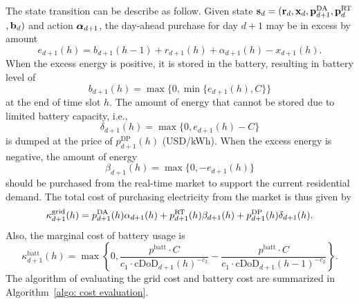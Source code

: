 The state transition can be describe as follow. Given state ${\mathbf s}_d = ({\mathbf r}_d,{\mathbf x}_d,{\mathbf p}^{\text{DA}}_{d+1},{\mathbf p}^{\text{RT}}_d$ $,{\mathbf b}_d)$ and action $\boldsymbol{\alpha}_{d+1}$, the day-ahead purchase for day $d+1$ may be in excess by amount
\begin{equation}
    e_{d+1}(h) = b_{d+1}(h-1) + r_{d+1}(h) + \alpha_{d+1}(h) - x_{d+1}(h).
\end{equation}
When the excess energy is positive, it is stored in the battery, resulting in battery level of
\begin{equation}
    b_{d+1}(h) = \max\{0,\min\{e_{d+1}(h),C\}\}
\end{equation}
at the end of time slot $h$. The amount of energy that cannot be stored due to limited battery capacity, i.e.,
\begin{equation}
    \delta_{d+1}(h) = \max\{0,e_{d+1}(h)-C\}
\end{equation}
is dumped at the price of $p^\text{DP}_{d+1}(h)$ (USD/kWh).  When the excess energy is negative, the amount of energy
\begin{equation}
    \beta_{d+1}(h) = \max\{0,-e_{d+1}(h)\}
\end{equation}
should be purchased from the real-time market to support the current residential demand. The total cost of purchasing electricity from the market is thus given by
\begin{equation}
    \kappa^\text{grid}_{d+1}(h) = p^{\text{DA}}_{d+1}(h)\alpha_{d+1}(h)+p^{\text{RT}}_{d+1}(h)\beta_{d+1}(h)+p^{\text{DP}}_{d+1}(h)\delta_{d+1}(h).
\end{equation}
Also, the marginal cost of battery usage is
\begin{equation}
    \kappa^\text{batt}_{d+1}(h) = \max\left\{0, \frac{p^\text{batt}\cdot C}{c_1\cdot\text{cDoD}_{d+1}(h)^{-c_2}}-\frac{p^\text{batt}\cdot C}{c_1\cdot\text{cDoD}_{d+1}(h-1)^{-c_2}}\right\}.
\end{equation}
The algorithm of evaluating the grid cost and battery cost are summarized in Algorithm~\ref{algo: cost evaluation}.


